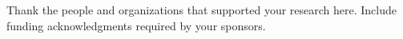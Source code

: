 Thank the people and organizations that supported your research here.
Include funding acknowledgments required by your sponsors.
